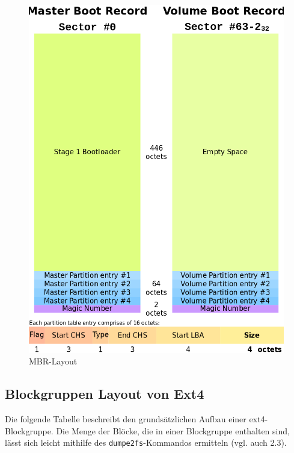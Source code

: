 \documentclass[11pt,a4paper]{article}
\def\inlinebash{\lstinline[style=bash]}
\begin{document}
\begin{figure}[h!]
	\centering
	\includegraphics[scale=0.4]{images/mbr_layout.png}
	\caption{MBR-Layout}
	\label{fig:mbr_layout}
\end{figure}

\subsection{Blockgruppen Layout von Ext4}
Die folgende Tabelle beschreibt den grundsätzlichen Aufbau einer ext4-Blockgruppe.
Die Menge der Blöcke, die in einer Blockgruppe enthalten sind, lässt sich leicht
mithilfe des \inlinebash$dumpe2fs$-Kommandos ermitteln (vgl. auch 2.3).

\paragraph{}
\end{document}
